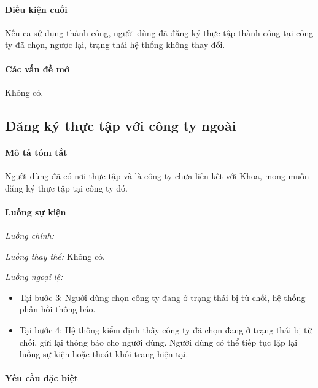 \documentclass[./../main.tex]{subfiles}
\begin{document}
\paragraph*{Điều kiện cuối}

Nếu ca sử dụng thành công, người dùng đã đăng ký thực tập thành công tại
công ty đã chọn, ngược lại, trạng thái hệ thống không thay đổi.

\paragraph*{Các vấn đề mở}

Không có.

\subsection{Đăng ký thực tập với công ty ngoài}

\paragraph*{Mô tả tóm tắt}

Người dùng đã có nơi thực tập và là công ty chưa liên kết với Khoa, mong
muốn đăng ký thực tập tại công ty đó.

\paragraph*{Luồng sự kiện}

\emph{Luồng chính:}

\emph{Luồng thay thế:} Không có.

\emph{Luồng ngoại lệ:}

\begin{itemize}
\item
  
  Tại bước 3: Người dùng chọn công ty đang ở trạng thái bị từ chối, hệ
  thống phản hồi thông báo.
  
\item
  
  Tại bước 4: Hệ thống kiểm định thấy công ty đã chọn đang ở trạng thái
  bị từ chối, gửi lại thông báo cho người dùng. Người dùng có thể tiếp
  tục lặp lại luồng sự kiện hoặc thoát khỏi trang hiện tại.
  
\end{itemize}

\paragraph*{Yêu cầu đặc biệt}
\end{document}

